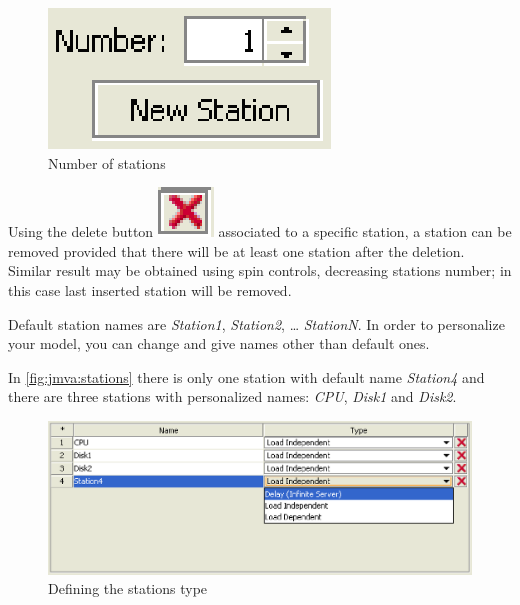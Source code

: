 \begin{figure}[htbp]
    \begin{center}
        \includegraphics[scale=.5]{img/jmva/stationNum}
    \end{center}
    \caption{Number of stations}
    \label{fig:jmva:stationNum}
\end{figure}

Using the delete button
\includegraphics[scale=.6]{img/jmva/x} associated to a specific
station, a station can be removed provided that there will be at
least one station after the deletion. Similar result may be obtained
using spin controls, decreasing stations number; in this case last
inserted station will be removed.

Default station names are \emph{Station1}, \emph{Station2}, \dots
\emph{StationN}. In order to personalize your model, you can change
and give names other than default ones.

In \autoref{fig:jmva:stations} there is only one station with
default name \emph{Station4} and there are three stations with
personalized names: \emph{CPU}, \emph{Disk1} and \emph{Disk2}.

\begin{figure}[htbp]
    \begin{center}
        \includegraphics[scale=.5]{img/jmva/4stations}
    \end{center}
    \caption{Defining the stations type}
    \label{fig:jmva:stations}
\end{figure}


